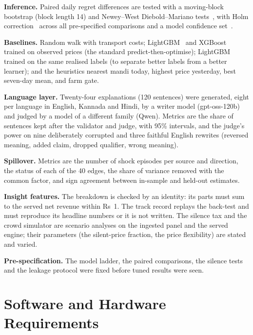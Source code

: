\noindent\textbf{Inference.} Paired daily regret differences are tested with a moving-block bootstrap (block length 14) and Newey--West Diebold--Mariano tests~\cite{diebold1995,newey1987,harvey1997}, with Holm correction~\cite{holm1979} across all pre-specified comparisons and a model confidence set~\cite{hansen2011}.

\noindent\textbf{Baselines.} Random walk with transport costs; LightGBM~\cite{ke2017} and XGBoost~\cite{chen2016} trained on observed prices (the standard predict-then-optimise); LightGBM trained on the same realised labels (to separate better labels from a better learner); and the heuristics nearest mandi today, highest price yesterday, best seven-day mean, and farm gate.

\noindent\textbf{Language layer.} Twenty-four explanations (120 sentences) were generated, eight per language in English, Kannada and Hindi, by a writer model (gpt-oss-120b) and judged by a model of a different family (Qwen). Metrics are the share of sentences kept after the validator and judge, with 95\% intervals, and the judge's power on nine deliberately corrupted and three faithful English rewrites (reversed meaning, added claim, dropped qualifier, wrong meaning).

\noindent\textbf{Spillover.} Metrics are the number of shock episodes per source and direction, the status of each of the 40 edges, the share of variance removed with the common factor, and sign agreement between in-sample and held-out estimates.

\noindent\textbf{Insight features.} The breakdown is checked by an identity: its parts must sum to the served net revenue within Rs~1. The track record replays the back-test and must reproduce its headline numbers or it is not written. The silence tax and the crowd simulator are scenario analyses on the ingested panel and the served engine; their parameters (the silent-price fraction, the price flexibility) are stated and varied.

\noindent\textbf{Pre-specification.} The model ladder, the paired comparisons, the silence tests and the leakage protocol were fixed before tuned results were seen.

\section{Software and Hardware Requirements}
\label{sec:swhw}

